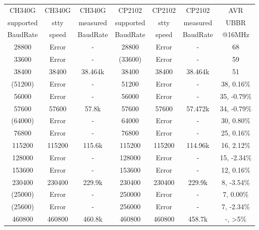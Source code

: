 \begin{table}[H]
  \begin{center}
    \begin{tabular}{| c | c | c || c | c | c || c |}
    \hline
    CH340G     & CH340G & CH340G    &  CP2102   & CP2102 & CP2102    & AVR \\
    supported  & stty   & measured  & supported & stty   & measured  & UBBR  \\
    BaudRate   & speed  & BaudRate  & BaudRate  & speed  & BaudRate  & @16MHz \\
    \hline
    \hline
      28800  &  Error   &   -       &  28800    & Error  &    -      &   68 \\
    \hline
      33600  &  Error   &   -       & (33600)   & Error  &    -      &   59  \\
    \hline
      38400  &  38400   &  38.464k  &  38400    & 38400  &  38.464k   &   51  \\
    \hline
     (51200) &  Error   &   -       &  51200    & Error  &    -      &   38,  0.16\%  \\
    \hline
      56000  &  Error   &   -       &  56000    & Error  &    -      &   35, -0.79\%  \\
    \hline
      57600  &  57600   &  57.8k    &  57600    & 57600  &  57.472k   &   34, -0.79\%  \\
    \hline
     (64000) &  Error   &   -       &  64000    & Error  &    -      &   30,  0.80\%  \\
    \hline
      76800  &  Error   &   -       &  76800    & Error  &    -      &   25, 0.16\%  \\
    \hline
     115200  &  115200  &  115.6k   &  115200   & 115200 & 114.96k   &   16, 2.12\%  \\
    \hline
     128000  &  Error   &   -       &  128000   & Error  &    -      &   15, -2.34\%  \\
    \hline
     153600  &  Error   &   -       &  153600   & Error  &    -      &   12, 0.16\%  \\
    \hline
     230400  &  230400  &  229.9k   &  230400   & 230400 &  229.9k   &   8, -3.54\%  \\
    \hline
    (25000)  &  Error   &   -       &  250000   & Error  &    -      &   7, 0.00\%  \\
    \hline
    (25600)  &  Error   &   -       &  256000   & Error  &    -      &   7, -2.34\%  \\
    \hline
     460800  &  460800  &  460.8k   &  460800   & 460800 & 458.7k    &   -, >5\%  \\

\end{tabular}
\end{center}
\end{table}
